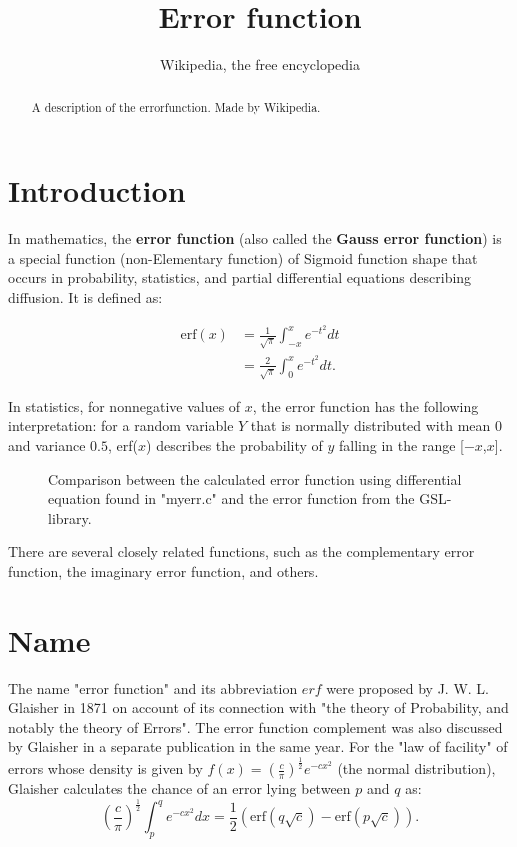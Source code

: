 \documentclass[twocolumn]{article}
\begin{document}
\title{Error function}
\author{Wikipedia, the free encyclopedia}
\date{}
\maketitle

\begin{abstract}
A description of the errorfunction. Made by Wikipedia.
\end{abstract}

\section{Introduction}
In mathematics, the \textbf{error function} (also called the \textbf{Gauss error function}) is a special function (non-Elementary function) of Sigmoid function shape that occurs in probability, statistics, and partial differential equations describing diffusion. It is defined as:


\begin{align}
\mathrm{erf}(x) & = \frac{1}{\sqrt{\pi}}\int_{-x}^x e^{-t^2} dt \\
& = \frac{2}{\sqrt{\pi}}\int_0^x e^{-t^2} dt.
\end{align} 


In statistics, for nonnegative values of $x$, the error function has the following interpretation: for a random variable $Y$ that is normally distributed with mean $0$ and variance $0.5$, erf($x$) describes the probability of $y$ falling in the range [$-x$,$x$].


\begin{figure}

\caption{Comparison between the calculated error function using differential equation found in "myerr.c" and the error function from the GSL-library.}
\label{fig-error}
\end{figure}


There are several closely related functions, such as the complementary error function, the imaginary error function, and others.


\section{Name}


The name "error function" and its abbreviation $erf$ were proposed by J. W. L. Glaisher in 1871 on account of its connection with "the theory of Probability, and notably the theory of Errors". The error function complement was also discussed by Glaisher in a separate publication in the same year. For the "law of facility" of errors whose density is given by $f(x)=\left(\frac{c}{\pi}\right)^{\frac{1}{2}}e^{-cx^2}$ (the normal distribution), Glaisher calculates the chance of an error lying between $p$ and $q$ as:
\begin{equation}
\left(\frac{c}{\pi}\right)^{\frac{1}{2}} \int_p^qe^{-cx^2}dx =\frac{1}{2}\left(\mathrm{erf} (q\sqrt{c}) -\mathrm{erf} (p\sqrt{c})\right)\mathrm{.}
\end{equation}
\end{document}
